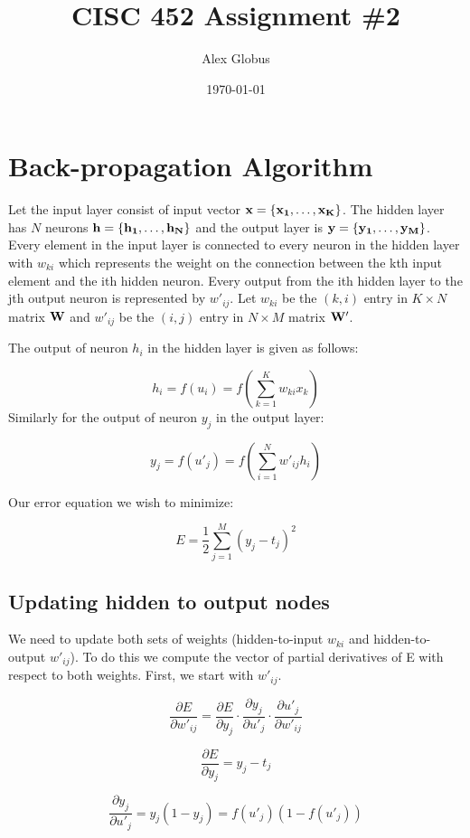 \documentclass[11pt]{article}
\author{Alex Globus}
\date{\today}
\title{CISC 452 Assignment \#2}
\begin{document}
\maketitle

\section{Back-propagation Algorithm}
\label{sec:orgheadline3}

Let the input layer consist of input vector \(\bf{x} = \{ x_1, \ldots, x_K \}\). The hidden layer has \(N\) neurons \(\bf{h} = \{h_1, \ldots, h_N \}\) and the output layer is \(\bf{y} = \{ y_1, \ldots, y_M \}\). Every element in the input layer is connected to every neuron in the hidden layer with \(w_{ki}\) which represents the weight on the connection between the kth input element and the ith hidden neuron. Every output from the ith hidden layer to the jth output neuron is represented by \(w'_{ij}\). Let \(w_{ki}\) be the \((k,i)\) entry in \(K \times N\) matrix \(\bf{W}\) and \(w'_{ij}\) be the \((i,j)\) entry in \(N \times M\) matrix \(\bf{W'}\).

The output of neuron \(h_{i}\) in the hidden layer is given as follows:

\[
h_i = f(u_i) = f(\sum\limits_{k=1}^{K} w_{ki}x_k)
\]
Similarly for the output of neuron \(y_j\) in the output layer:

\[
y_j = f(u'_j) = f(\sum\limits_{i=1}^{N} w'_{ij}h_i)
\]

Our error equation we wish to minimize:

\[
E = \frac{1}{2} \sum\limits_{j=1}^{M}(y_j - t_j)^2
\]
\subsection{Updating hidden to output nodes}
\label{sec:orgheadline1}

We need to update both sets of weights (hidden-to-input \(w_{ki}\) and hidden-to-output \(w'_{ij}\)). To do this we compute the vector of partial derivatives of E with respect to both weights. First, we start with \(w'_{ij}\).

\[
\frac{\partial E}{\partial w'_{ij}} = \frac{\partial E}{\partial y_j} \cdot \frac{\partial y_j}{\partial u'_j} \cdot \frac{\partial u'_j}{\partial w'_{ij}}
\]

\[
\frac{\partial E}{\partial y_j} = y_j - t_j
\]

\[
\frac{\partial y_j}{\partial u'_j} = y_j(1 - y_j) = f(u'_j)(1 - f(u'_j))
\]
\end{document}
